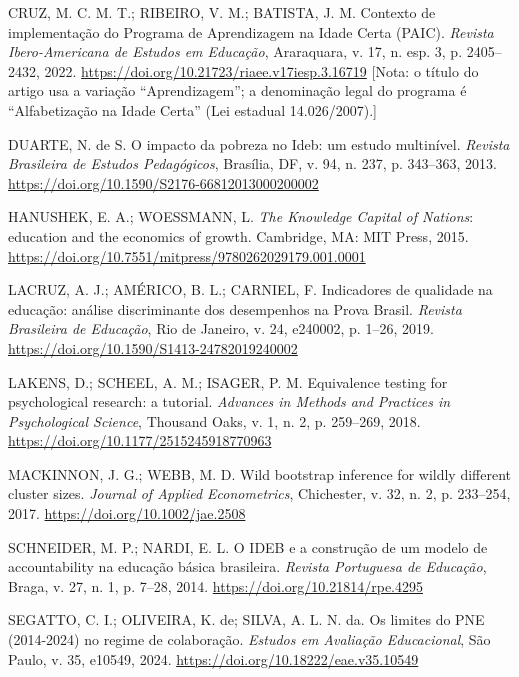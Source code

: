\documentclass[12pt,a4paper]{article}
\begin{document}
{\noindent CRUZ, M. C. M. T.; RIBEIRO, V. M.; BATISTA, J. M. Contexto de implementação do Programa de Aprendizagem na Idade Certa (PAIC). \textit{Revista Ibero-Americana de Estudos em Educação}, Araraquara, v. 17, n. esp. 3, p. 2405--2432, 2022. \href{https://doi.org/10.21723/riaee.v17iesp.3.16719}{https://doi.org/10.21723/riaee.v17iesp.3.16719} [Nota: o título do artigo usa a variação ``Aprendizagem''; a denominação legal do programa é ``Alfabetização na Idade Certa'' (Lei estadual 14.026/2007).]

\noindent DUARTE, N. de S. O impacto da pobreza no Ideb: um estudo multinível. \textit{Revista Brasileira de Estudos Pedagógicos}, Brasília, DF, v. 94, n. 237, p. 343--363, 2013. \href{https://doi.org/10.1590/S2176-66812013000200002}{https://doi.org/10.1590/S2176-66812013000200002}

\noindent HANUSHEK, E. A.; WOESSMANN, L. \textit{The Knowledge Capital of Nations}: education and the economics of growth. Cambridge, MA: MIT Press, 2015. \href{https://doi.org/10.7551/mitpress/9780262029179.001.0001}{https://doi.org/10.7551/mitpress/9780262029179.001.0001}

\noindent LACRUZ, A. J.; AMÉRICO, B. L.; CARNIEL, F. Indicadores de qualidade na educação: análise discriminante dos desempenhos na Prova Brasil. \textit{Revista Brasileira de Educação}, Rio de Janeiro, v. 24, e240002, p. 1--26, 2019. \href{https://doi.org/10.1590/S1413-24782019240002}{https://doi.org/10.1590/S1413-24782019240002}

\noindent LAKENS, D.; SCHEEL, A. M.; ISAGER, P. M. Equivalence testing for psychological research: a tutorial. \textit{Advances in Methods and Practices in Psychological Science}, Thousand Oaks, v. 1, n. 2, p. 259--269, 2018. \href{https://doi.org/10.1177/2515245918770963}{https://doi.org/10.1177/2515245918770963}

\noindent MACKINNON, J. G.; WEBB, M. D. Wild bootstrap inference for wildly different cluster sizes. \textit{Journal of Applied Econometrics}, Chichester, v. 32, n. 2, p. 233--254, 2017. \href{https://doi.org/10.1002/jae.2508}{https://doi.org/10.1002/jae.2508}

\noindent SCHNEIDER, M. P.; NARDI, E. L. O IDEB e a construção de um modelo de accountability na educação básica brasileira. \textit{Revista Portuguesa de Educação}, Braga, v. 27, n. 1, p. 7--28, 2014. \href{https://doi.org/10.21814/rpe.4295}{https://doi.org/10.21814/rpe.4295}

\noindent SEGATTO, C. I.; OLIVEIRA, K. de; SILVA, A. L. N. da. Os limites do PNE (2014-2024) no regime de colaboração. \textit{Estudos em Avaliação Educacional}, São Paulo, v. 35, e10549, 2024. \href{https://doi.org/10.18222/eae.v35.10549}{https://doi.org/10.18222/eae.v35.10549}

}
\end{document}
